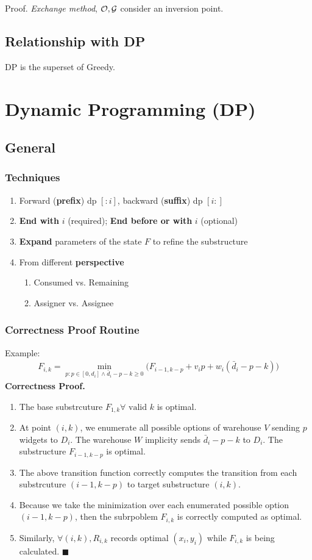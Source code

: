 \documentclass[a4paper]{report}
\theoremstyle{definition}
\begin{document}
Proof. \textit{Exchange method}, $\mathcal{O}, \mathcal{G}$ consider an inversion point.

\section{Relationship with DP}
DP is the superset of Greedy.
\chapter{Dynamic Programming (DP)}
\section{General}
\subsection{Techniques}
\begin{enumerate}
\item Forward (\textbf{prefix}) dp $[:i]$, backward (\textbf{suffix}) dp $[i:]$
\item \textbf{End with} $i$ (required); \textbf{End before or with} $i$ (optional)
\item \textbf{Expand} parameters of the state $F$ to refine the substructure
\item From different \textbf{perspective}
\begin{enumerate}
\item Consumed vs. Remaining
\item Assigner vs. Assignee
\end{enumerate}
\end{enumerate}
\subsection{Correctness Proof Routine}
Example:
\begin{align*}
F_{i, k} = \min_{p: p\in [0, d_i] \wedge \bar d_i-p-k \geq 0}\Big(F_{i-1, k-p} +v_ip+w_i(\bar
d_i-p-k)\Big)
\end{align*}
\textbf{Correctness Proof.}
\begin{enumerate}
\item The base substrcuture $F_{1, k} \forall \text{ valid }k$ is optimal.
\item At point $(i, k)$, we enumerate all possible options of warehouse $V$ sending
$p$ widgets to $D_i$. The warehouse $W$ implicity sends $\bar d_i -p-k$ to $D_i$. The
substructure $F_{i-1, k-p}$ is optimal. 
\item The above transition function correctly computes the transition from each substrcuture
$(i-1, k-p)$ to target substructure $(i, k)$. 
\item Because we take the minimization over each enumerated possible option $(i-1,
k-p)$, then the subrpoblem $F_{i, k}$ is correctly computed as optimal. 
\item Similarly, $\forall (i, k), R_{i, k}$ records optimal $(x_i, y_i)$ while $F_{i,
k}$ is being calculated.  $\blacksquare$
\end{enumerate}
\end{document}
